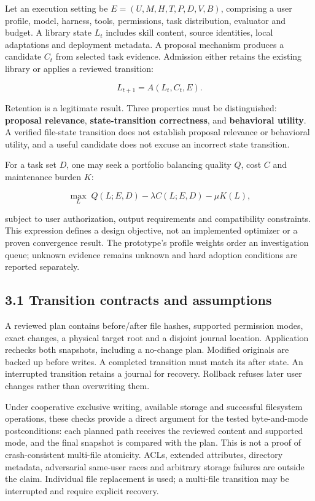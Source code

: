 \documentclass[
  11pt,
]{article}
\begin{document}
Let an execution setting be \(E=(U,M,H,T,P,D,V,B)\), comprising a user
profile, model, harness, tools, permissions, task distribution,
evaluator and budget. A library state \(L_t\) includes skill content,
source identities, local adaptations and deployment metadata. A proposal
mechanism produces a candidate \(C_t\) from selected task evidence.
Admission either retains the existing library or applies a reviewed
transition:

\[L_{t+1}=A(L_t,C_t,E).\]

Retention is a legitimate result. Three properties must be
distinguished: \textbf{proposal relevance}, \textbf{state-transition
correctness}, and \textbf{behavioral utility}. A verified file-state
transition does not establish proposal relevance or behavioral utility,
and a useful candidate does not excuse an incorrect state transition.

For a task set \(D\), one may seek a portfolio balancing quality \(Q\),
cost \(C\) and maintenance burden \(K\):

\[\max_L\; Q(L;E,D)-\lambda C(L;E,D)-\mu K(L),\]

subject to user authorization, output requirements and compatibility
constraints. This expression defines a design objective, not an
implemented optimizer or a proven convergence result. The prototype's
profile weights order an investigation queue; unknown evidence remains
unknown and hard adoption conditions are reported separately.

\subsection{3.1 Transition contracts and
assumptions}\label{transition-contracts-and-assumptions}

A reviewed plan contains before/after file hashes, supported permission
modes, exact changes, a physical target root and a disjoint journal
location. Application rechecks both snapshots, including a no-change
plan. Modified originals are backed up before writes. A completed
transition must match its after state. An interrupted transition retains
a journal for recovery. Rollback refuses later user changes rather than
overwriting them.

Under cooperative exclusive writing, available storage and successful
filesystem operations, these checks provide a direct argument for the
tested byte-and-mode postconditions: each planned path receives the
reviewed content and supported mode, and the final snapshot is compared
with the plan. This is not a proof of crash-consistent multi-file
atomicity. ACLs, extended attributes, directory metadata, adversarial
same-user races and arbitrary storage failures are outside the claim.
Individual file replacement is used; a multi-file transition may be
interrupted and require explicit recovery.
\end{document}
